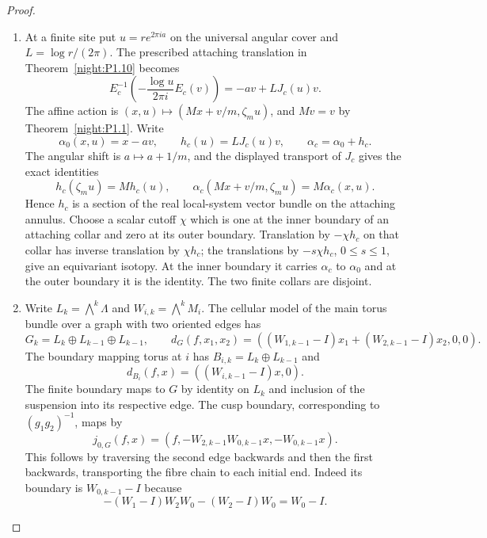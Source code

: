 \begin{proof}
\begin{enumerate}[label=\arabic*.]
\item At a finite site put $u=r e^{2\pi ia}$ on the universal angular
cover and $L=\log r/(2\pi)$. The prescribed attaching translation in
Theorem~\ref{night:P1.10} becomes
\[
 E_c^{-1}\!\left(-\frac{\log u}{2\pi i}E_c(v)\right)
       =-av+LJ_c(u)v.
\]
The affine action is $(x,u)\mapsto(Mx+v/m,\zeta_m u)$, and $Mv=v$ by
Theorem~\ref{night:P1.1}. Write
\[
 \alpha_0(x,u)=x-av,
 \qquad h_c(u)=LJ_c(u)v,
 \qquad \alpha_c=\alpha_0+h_c.
\]
The angular shift is $a\mapsto a+1/m$, and the displayed transport of
$J_c$ gives the exact identities
\[
 h_c(\zeta_m u)=M h_c(u),\qquad
 \alpha_c(Mx+v/m,\zeta_m u)=M\alpha_c(x,u).
\]
Hence $h_c$ is a section of the real local-system vector bundle on
the attaching annulus. Choose a scalar cutoff $\chi$ which is one at
the inner boundary of an attaching collar and zero at its outer
boundary. Translation by $-\chi h_c$ on that collar has inverse
translation by $\chi h_c$; the translations by $-s\chi h_c$,
$0\leq s\leq1$, give an equivariant isotopy. At the inner boundary
it carries $\alpha_c$ to $\alpha_0$ and at the outer boundary it is
the identity. The two finite collars are disjoint.

\item Write $L_k=\bigwedge^k\Lambda$ and $W_{i,k}=\bigwedge^kM_i$.
The cellular model of the main torus bundle over a graph with two
oriented edges has
\[
G_k=L_k\oplus L_{k-1}\oplus L_{k-1},\qquad
d_G(f,x_1,x_2)=((W_{1,k-1}-I)x_1+(W_{2,k-1}-I)x_2,0,0).
\tag{1.12.1}
\]
The boundary mapping torus at $i$ has
$B_{i,k}=L_k\oplus L_{k-1}$ and
\[
d_{B_i}(f,x)=((W_{i,k-1}-I)x,0).
\tag{1.12.2}
\]
The finite boundary maps to $G$ by identity on $L_k$ and inclusion
of the suspension into its respective edge.  The cusp boundary,
corresponding to $(g_1g_2)^{-1}$, maps by
\[
j_{0,G}(f,x)=(f,-W_{2,k-1}W_{0,k-1}x,-W_{0,k-1}x).
\tag{1.12.3}
\]
This follows by traversing the second edge backwards and then the
first backwards, transporting the fibre chain to each initial end.
Indeed its boundary is $W_{0,k-1}-I$ because
\[
-(W_1-I)W_2W_0-(W_2-I)W_0=W_0-I.
\]


\end{enumerate}
\end{proof}
